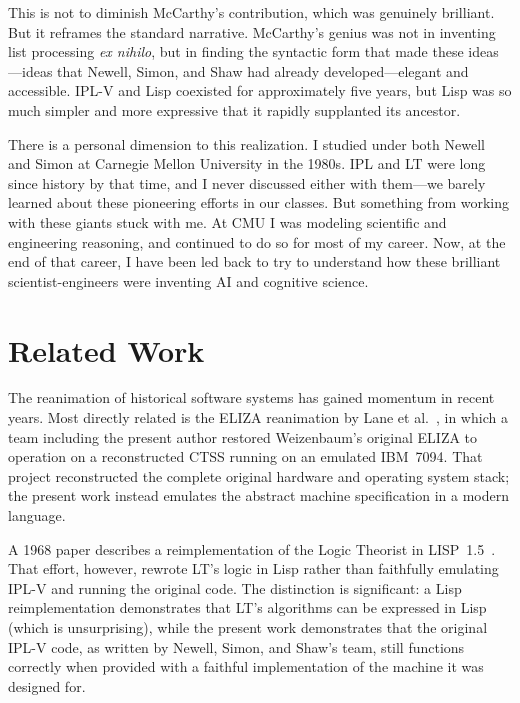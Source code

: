 \documentclass[journal]{IEEEtran}
\begin{document}
This is not to diminish McCarthy's contribution, which was genuinely
brilliant. But it reframes the standard narrative. McCarthy's genius
was not in inventing list processing \textit{ex nihilo}, but in
finding the syntactic form that made these ideas---ideas that Newell,
Simon, and Shaw had already developed---elegant and accessible. IPL-V
and Lisp coexisted for approximately five years, but Lisp was so much
simpler and more expressive that it rapidly supplanted its ancestor.

There is a personal dimension to this realization. I studied under
both Newell and Simon at Carnegie Mellon University in the 1980s. IPL
and LT were long since history by that time, and I never discussed
either with them---we barely learned about these pioneering efforts in
our classes. But something from working with these giants stuck with
me. At CMU I was modeling scientific and engineering reasoning, and
continued to do so for most of my career. Now, at the end of that
career, I have been led back to try to understand how these brilliant
scientist-engineers were inventing AI and cognitive science.

\section{Related Work}
\label{sec:related}

The reanimation of historical software systems has gained momentum in
recent years. Most directly related is the ELIZA reanimation by Lane
et al.~\cite{lane2025eliza}, in which a team including the present
author restored Weizenbaum's original ELIZA to operation on a
reconstructed CTSS running on an emulated IBM~7094. That project
reconstructed the complete original hardware and operating system
stack; the present work instead emulates the abstract machine
specification in a modern language.

A 1968 paper describes a reimplementation of the Logic Theorist in
LISP~1.5~\cite{geiger1968lt}. That effort, however, rewrote LT's
logic in Lisp rather than faithfully emulating IPL-V and running the
original code. The distinction is significant: a Lisp reimplementation
demonstrates that LT's algorithms can be expressed in Lisp (which is
unsurprising), while the present work demonstrates that the original
IPL-V code, as written by Newell, Simon, and Shaw's team, still
functions correctly when provided with a faithful implementation of
the machine it was designed for.
\end{document}
